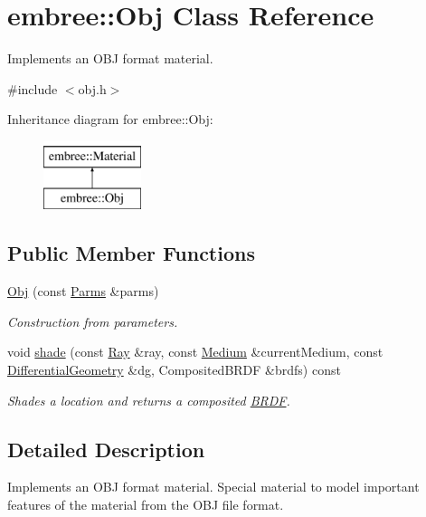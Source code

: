\hypertarget{classembree_1_1_obj}{
\section{embree::Obj Class Reference}
\label{classembree_1_1_obj}
}


Implements an OBJ format material.  




{\ttfamily \#include $<$obj.h$>$}

Inheritance diagram for embree::Obj:\begin{figure}[H]
\begin{center}
\leavevmode
\includegraphics[height=2.000000cm]{classembree_1_1_obj}
\end{center}
\end{figure}
\subsection*{Public Member Functions}
\begin{DoxyCompactItemize}
\item 
\hyperlink{classembree_1_1_obj_a22a1bbb02cfd1b07e50694ddcbf0d23b}{Obj} (const \hyperlink{classembree_1_1_parms}{Parms} \&parms)
\begin{DoxyCompactList}\small\item\em Construction from parameters. \item\end{DoxyCompactList}\item 
void \hyperlink{classembree_1_1_obj_a37881d0c57dede7a0d95256a9172d0a2}{shade} (const \hyperlink{structembree_1_1_ray}{Ray} \&ray, const \hyperlink{classembree_1_1_medium}{Medium} \&currentMedium, const \hyperlink{structembree_1_1_differential_geometry}{DifferentialGeometry} \&dg, CompositedBRDF \&brdfs) const 
\begin{DoxyCompactList}\small\item\em Shades a location and returns a composited \hyperlink{classembree_1_1_b_r_d_f}{BRDF}. \item\end{DoxyCompactList}\end{DoxyCompactItemize}


\subsection{Detailed Description}
Implements an OBJ format material. Special material to model important features of the material from the OBJ file format. 

